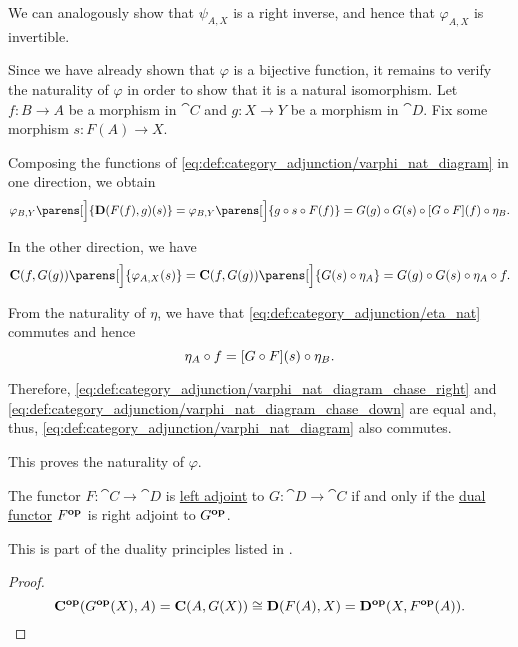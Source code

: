 \begin{defproof}
  We can analogously show that \( \psi_{A,X} \) is a right inverse, and hence that \( \varphi_{A,X} \) is invertible.

  Since we have already shown that \( \varphi \) is a bijective function, it remains to verify the naturality of \( \varphi \) in order to show that it is a natural isomorphism. Let \( f: B \to A \) be a morphism in \( \cat{C} \) and \( g: X \to Y \) be a morphism in \( \cat{D} \). Fix some morphism \( s: F(A) \to X \).

  Composing the functions of \eqref{eq:def:category_adjunction/varphi_nat_diagram} in one direction, we obtain
  \begin{equation}\label{eq:def:category_adjunction/varphi_nat_diagram_chase_right}
    \varphi_{B, Y}\parens[\Big]{ \cat{D}(F(f), g)(s) }
    =
    \varphi_{B, Y}\parens[\Big]{ g \bincirc s \bincirc F(f) }
    =
    G(g) \bincirc G(s) \bincirc [G \bincirc F](f) \bincirc \eta_B.
  \end{equation}

  In the other direction, we have
  \begin{equation}\label{eq:def:category_adjunction/varphi_nat_diagram_chase_down}
    \cat{C}(f, G(g))\parens[\Big]{ \varphi_{A, X}(s) }
    =
    \cat{C}(f, G(g))\parens[\Big]{ G(s) \bincirc \eta_A }
    =
    G(g) \bincirc G(s) \bincirc \eta_A \bincirc f.
  \end{equation}

  From the naturality of \( \eta \), we have that \eqref{eq:def:category_adjunction/eta_nat} commutes and hence
  \begin{equation*}
    \eta_A \bincirc f
    =
    [G \bincirc F](s) \bincirc \eta_B.
  \end{equation*}

  Therefore, \eqref{eq:def:category_adjunction/varphi_nat_diagram_chase_right} and \eqref{eq:def:category_adjunction/varphi_nat_diagram_chase_down} are equal and, thus, \eqref{eq:def:category_adjunction/varphi_nat_diagram} also commutes.

  This proves the naturality of \( \varphi \).
\end{defproof}

\begin{proposition}\label{thm:category_adjunction_duality}
  The functor \( F: \cat{C} \to \cat{D} \) is \hyperref[def:category_adjunction]{left adjoint} to \( G: \cat{D} \to \cat{C} \) if and only if the \hyperref[def:opposite_functor]{dual functor} \( F^\oppos \) is right adjoint to \( G^\oppos \).

  This is part of the duality principles listed in .
\end{proposition}
\begin{proof}
  \begin{equation*}
    \cat{C^\oppos}(G^\oppos(X), A) = \cat{C}(A, G(X)) \cong \cat{D}(F(A), X) = \cat{D^\oppos}(X, F^\oppos(A)).
  \end{equation*}
\end{proof}

